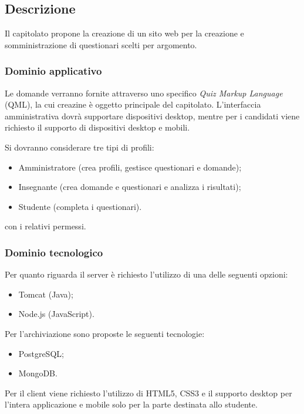 \documentclass[12pt,a4paper]{article}
\begin{document}
\subsection{Descrizione}

Il capitolato propone la creazione di un sito web per la creazione e somministrazione di questionari scelti
per argomento.

\subsubsection{Dominio applicativo}

Le domande verranno fornite attraverso uno specifico \textit{Quiz Markup Language} (QML), la cui creazine
è oggetto principale del capitolato.
L'interfaccia amministrativa dovrà supportare dispositivi desktop, mentre per i candidati viene richiesto 
il supporto di dispositivi desktop e mobili.

Si dovranno considerare tre tipi di profili:

\begin{itemize}
\item Amministratore (crea profili, gestisce questionari e domande);
\item Insegnante (crea domande e questionari e analizza i risultati);
\item Studente (completa i questionari).
\end{itemize}

con i relativi permessi.

\subsubsection{Dominio tecnologico}

Per quanto riguarda il server è richiesto l'utilizzo di una delle seguenti opzioni:

\begin{itemize}
\item Tomcat (Java);
\item Node.js (JavaScript).
\end{itemize}

Per l'archiviazione sono proposte le seguenti tecnologie:

\begin{itemize}
\item PostgreSQL;
\item MongoDB.
\end{itemize}

Per il client viene richiesto l'utilizzo di HTML5, CSS3 e il supporto desktop per l'intera applicazione e mobile
solo per la parte destinata allo studente.
\end{document}
